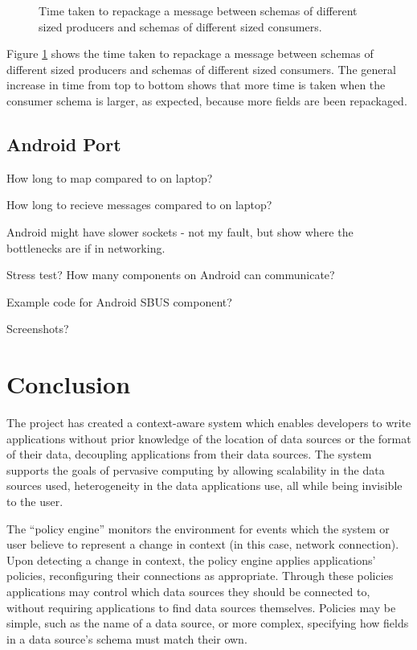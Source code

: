 \documentclass[12pt,twoside,notitlepage]{report}
\begin{document}
\begin{figure}[tbh]
\centerline{}
\caption[Repackage Message]{Time taken to repackage a message between schemas of different sized producers and schemas of different sized consumers.}
\label{fig:repack_message}
\end{figure}

Figure \ref{fig:repack_message} shows the time taken to repackage a message between schemas of different sized producers and schemas of different sized consumers. 
The general increase in time from top to bottom shows that more time is taken when the consumer schema is larger, as expected, because more fields are been repackaged.

\section{Android Port}

How long to map compared to on laptop?

How long to recieve messages compared to on laptop?

Android might have slower sockets - not my fault, but show where the bottlenecks are if in networking.

Stress test? How many components on Android can communicate?

Example code for Android SBUS component?

Screenshots?

\cleardoublepage

\chapter{Conclusion}

The project has created a context-aware system which enables developers to write applications without prior knowledge of the location of data sources or the format of their data, decoupling applications from their data sources. 
The system supports the goals of pervasive computing by allowing scalability in the data sources used, heterogeneity in the data applications use, all while being invisible to the user.

The ``policy engine'' monitors the environment for events which the system or user believe to represent a change in context (in this case, network connection).
Upon detecting a change in context, the policy engine applies applications' policies, reconfiguring their connections as appropriate. 
Through these policies applications may control which data sources they should be connected to, without requiring applications to find data sources themselves.
Policies may be simple, such as the name of a data source, or more complex, specifying how fields in a data source's schema must match their own. 
\end{document}

